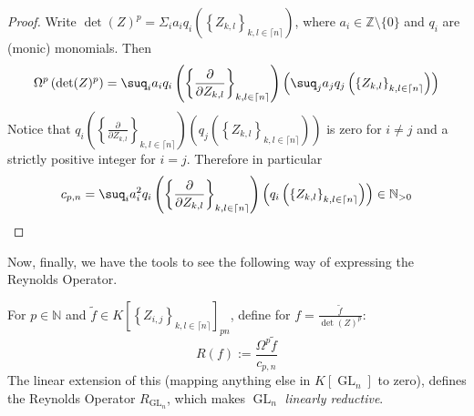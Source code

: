 \begin{proof}
  Write $ \operatorname{det} (Z)^p = \Sigma_i a_i q_i \left( \left\{ Z_{k,l} \right\}_{k,l \in \lceil n \rceil} \right) $, where $a_i \in \mathbb{Z} \setminus \{0\}$ and $q_i$ are (monic) monomials.
  Then
  \begin{equation}
    \Omega^p \left( \operatorname{det} (Z)^p \right)
    = \suq_i a_i q_i \left( \left\{ \frac{\partial}{\partial Z_{k,l}} \right\}_{k,l \in \lceil n \rceil} \right) \left( \suq_j a_j q_j \left( \left\{ Z_{k,l} \right\}_{k,l \in \lceil n \rceil} \right) \right)
  \end{equation}
  Notice that $ q_i \left( \left\{ \frac{\partial}{\partial Z_{k,l}} \right\}_{k,l \in \lceil n \rceil} \right) \left( q_j \left( \left\{ Z_{k,l} \right\}_{k,l \in \lceil n \rceil} \right) \right) $ is zero for $ i \neq j $ and a strictly positive integer for $ i = j $.
  Therefore in particular
  \begin{equation}
    c_{p,n}
    = \suq_i a_i^2 q_i \left( \left\{ \frac{\partial}{\partial Z_{k,l}} \right\}_{k,l \in \lceil n \rceil} \right) \left( q_i \left( \left\{ Z_{k,l} \right\}_{k,l \in \lceil n \rceil} \right) \right) \in \mathbb{N}_{>0}
  \end{equation}
\end{proof}
Now, finally, we have the tools to see the following way of expressing the Reynolds Operator.
\begin{theorem}
  For $ p \in \mathbb{N} $ and $ \tilde{f} \in K \left\lbrack \left\{ Z_{i,j} \right\}_{k,l \in \lceil n \rceil} \right\rbrack_{pn} $, define for $ f = \frac{\tilde{f}}{\operatorname{det}(Z)^p}$:
  \begin{equation}
    R \left( f \right) := \frac{\Omega^p \tilde{f}}{c_{p,n}}
  \end{equation}
  The linear extension of this (mapping anything else in $K \left\lbrack \operatorname{GL}_n \right\rbrack$ to zero), defines the Reynolds Operator $R_{\operatorname{GL}_n}$, which makes $\operatorname{GL}_n$ \textit{linearly reductive}.
\end{theorem}

